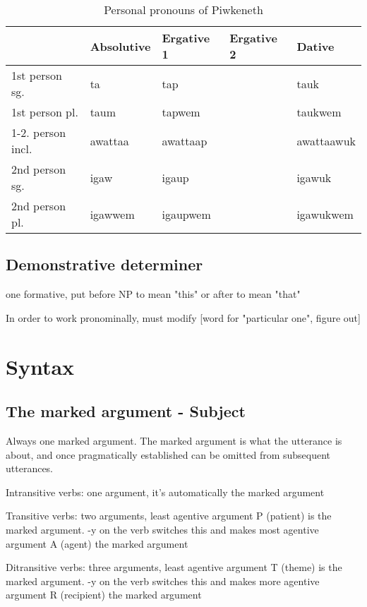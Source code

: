 \documentclass[smallroyalvopaper,9pt]{memoir}
\newcommand{\lang}{Piwkeneth}
\begin{document}
\begin{table}[ht]
    \centering
    \begin{tabular}{lllll}
        \toprule
                             & Absolutive & Ergative 1 & Ergative 2 & Dative \\
        \midrule
        1st person sg.       & ta         & tap      &   & tauk \\
        1st person pl.       & taum       & tapwem   &   & taukwem \\
        1-2. person incl.    & awattaa    & awattaap &   & awattaawuk \\
        2nd person sg.       & igaw       & igaup    &   & igawuk \\
        2nd person pl.       & igawwem    & igaupwem &   & igawukwem \\
        \bottomrule
    \end{tabular}
    \caption{Personal pronouns of \lang}
\end{table}

\section{Demonstrative determiner}

one formative, put before NP to mean "this" or after to mean "that"

In order to work pronominally, must modify [word for "particular one", figure out]

\chapter{Syntax}


\section{The marked argument - Subject}

Always one marked argument. The marked argument is what the utterance is about, and once pragmatically established can be omitted from subsequent utterances. 

Intransitive verbs: one argument, it's automatically the marked argument

Transitive verbs: two arguments, least agentive argument P (patient) is the marked argument. -y on the verb switches this and makes most agentive argument A (agent) the marked argument

Ditransitive verbs: three arguments, least agentive argument T (theme) is the marked argument. -y on the verb switches this and makes more agentive argument R (recipient) the marked argument
\end{document}
